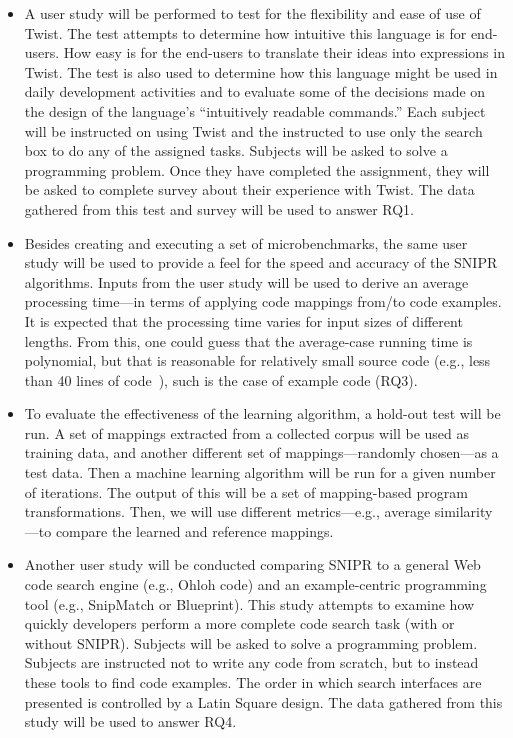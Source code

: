 \documentclass[conference]{IEEEtran}
\begin{document}
\begin{itemize}  
\item A user study will be performed to test for the flexibility and ease of use of Twist. The test attempts to determine how intuitive this language is for end-users. How easy is for the end-users to translate their ideas into expressions in Twist. The test is also used to determine how this language might be used in daily development activities and to evaluate some of the decisions made on the design of the language's ``intuitively readable commands.'' Each subject will be instructed on using Twist and the instructed to use only the search box to do any of the assigned tasks. Subjects will be asked to solve a programming problem. Once they have completed the assignment, they will be asked to complete survey about their experience with Twist. The data gathered from this test and survey will be used to answer RQ1.
\item Besides creating and executing a set of microbenchmarks, the same user study will be used to provide a feel for the speed and accuracy of the  \uppercase{SnipR} algorithms. Inputs from the user study will be used to derive an average processing time---in terms of applying code mappings from/to code examples. It is expected that the processing time varies for input sizes of different lengths. From this, one could guess that the average-case running time is polynomial, but that is reasonable for relatively small source code (e.g., less than 40 lines of code~\cite{Brandt:2009ew}), such is the case of example code (RQ3).
\item To evaluate the effectiveness of the learning algorithm, a hold-out test will be run. A set of mappings extracted from a collected corpus will be used as training data, and another different set of mappings---randomly chosen---as a test data. Then a machine learning algorithm will be run for a given number of iterations. The output of this will be a set of mapping-based program transformations. Then, we will use different metrics---e.g., average similarity---to compare the learned and reference mappings. 
\item Another user study will be conducted comparing \uppercase{SnipR} to a general Web code search engine (e.g., Ohloh code) and an example-centric programming tool (e.g., SnipMatch or Blueprint). This study attempts to examine how quickly developers perform a more complete code search task (with or without \uppercase{SnipR}). Subjects will be asked to solve a programming problem. Subjects are instructed not to write any code from scratch, but to instead these tools to find code examples. The order in which search interfaces are presented is controlled by a Latin Square design. The data gathered from this study will be used to answer RQ4.       
\end{itemize}
\end{document}

